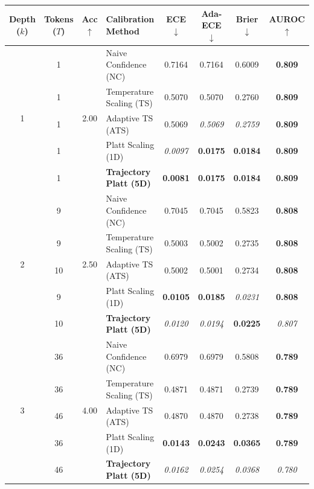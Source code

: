 \begin{table}[t]
\setlength{\tabcolsep}{4pt}
\renewcommand{\arraystretch}{1.05}
\centering
\footnotesize
\begin{tabular}{ccclcccc}
\toprule
\textbf{Depth ($k$)} & \textbf{Tokens ($T$)} & \textbf{Acc} $\uparrow$ & \textbf{Calibration Method} & \textbf{ECE} $\downarrow$ & \textbf{Ada-ECE} $\downarrow$ & \textbf{Brier} $\downarrow$ & \textbf{AUROC} $\uparrow$ \\
\midrule
\multirow{5}{*}{1} & 1 & \multirow{5}{*}{2.00} & Naive Confidence (NC) & 0.7164 & 0.7164 & 0.6009 & \textbf{0.809} \\
 & 1 &  & Temperature Scaling (TS) & 0.5070 & 0.5070 & 0.2760 & \textbf{0.809} \\
 & 1 &  & Adaptive TS (ATS) & 0.5069 & \textit{0.5069} & \textit{0.2759} & \textbf{0.809} \\
 & 1 &  & Platt Scaling (1D) & \textit{0.0097} & \textbf{0.0175} & \textbf{0.0184} & \textbf{0.809} \\
 & 1 &  & \textbf{Trajectory Platt (5D)} & \textbf{0.0081} & \textbf{0.0175} & \textbf{0.0184} & \textbf{0.809} \\
\midrule
\multirow{5}{*}{2} & 9 & \multirow{5}{*}{2.50} & Naive Confidence (NC) & 0.7045 & 0.7045 & 0.5823 & \textbf{0.808} \\
 & 9 &  & Temperature Scaling (TS) & 0.5003 & 0.5002 & 0.2735 & \textbf{0.808} \\
 & 10 &  & Adaptive TS (ATS) & 0.5002 & 0.5001 & 0.2734 & \textbf{0.808} \\
 & 9 &  & Platt Scaling (1D) & \textbf{0.0105} & \textbf{0.0185} & \textit{0.0231} & \textbf{0.808} \\
 & 10 &  & \textbf{Trajectory Platt (5D)} & \textit{0.0120} & \textit{0.0194} & \textbf{0.0225} & \textit{0.807} \\
\midrule
\multirow{5}{*}{3} & 36 & \multirow{5}{*}{4.00} & Naive Confidence (NC) & 0.6979 & 0.6979 & 0.5808 & \textbf{0.789} \\
 & 36 &  & Temperature Scaling (TS) & 0.4871 & 0.4871 & 0.2739 & \textbf{0.789} \\
 & 46 &  & Adaptive TS (ATS) & 0.4870 & 0.4870 & 0.2738 & \textbf{0.789} \\
 & 36 &  & Platt Scaling (1D) & \textbf{0.0143} & \textbf{0.0243} & \textbf{0.0365} & \textbf{0.789} \\
 & 46 &  & \textbf{Trajectory Platt (5D)} & \textit{0.0162} & \textit{0.0254} & \textit{0.0368} & \textit{0.780} \\

\end{tabular}
\end{table}
